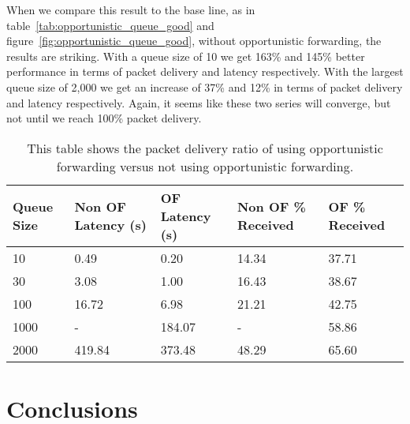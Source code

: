         When we compare this result to the base line, as in table~\ref{tab:opportunistic_queue_good} and figure~\ref{fig:opportunistic_queue_good}, without opportunistic forwarding, the results are striking. With a queue size of 10 we get 163\% and 145\% better performance in terms of packet delivery and latency respectively. With the largest queue size of 2,000 we get an increase of 37\% and 12\% in terms of packet delivery and latency respectively. Again, it seems like these two series will converge, but not until we reach 100\% packet delivery.

        \begin{table}
            \centering
            \begin{tabularx}{0.8\linewidth}{|X|X|X|X|X|}
                \hline
                \multicolumn{1}{|X|}{\centering Queue Size} & 
                \multicolumn{1}{|X|}{\centering Non OF Latency (s)} & 
                \multicolumn{1}{|X|}{\centering OF Latency (s)} & 
                \multicolumn{1}{|X|}{\centering Non OF \% Received} & 
                \multicolumn{1}{|X|}{\centering OF \% Received} \\
                \hline
                10 & 0.49 & 0.20 & 14.34 & 37.71 \\
                30 & 3.08 & 1.00 & 16.43 & 38.67 \\
                100 & 16.72 & 6.98 & 21.21 & 42.75 \\
                1000 & - & 184.07 & - & 58.86 \\
                2000 & 419.84 & 373.48 & 48.29 & 65.60 \\
                \hline
            \end{tabularx}
            \caption{This table shows the packet delivery ratio of using opportunistic forwarding versus not using opportunistic forwarding.}
            \label{tab:opportunistic_forwarding}
        \end{table}
        
        \missingfigure{}

    \section{Conclusions}\label{data_gathering_performance_conclusions}


